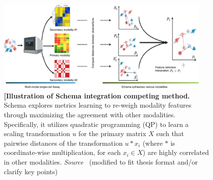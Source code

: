 \begin{figure}[!ht]
	\centering
	\includegraphics[width=0.95\textwidth]{Alg_Schema/fig}
	\vspace{0.1cm}
	\caption[Illustration of Schema integration competing method.]{\textbf{[Illustration of Schema integration competing method.} Schema explores metrics learning to re-weigh modality features through maximizing the agreement with other modalities. Specifically, it utilizes quadratic programming (QP) to learn a scaling transformation $u$ for the primary matrix $X$ such that pairwise distances of the transformation $u * x_i$ (where $*$ is coordinate-wise multiplication, for each $x_i\in X$) are highly correlated in other modalities. \emph{Source ~\cite{singh2021schema}}(modified to fit thesis format and/or clarify key points)
}
	\label{fig:Alg_Schema}
\end{figure}

